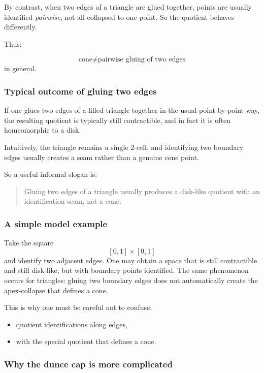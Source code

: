 \documentclass[12pt,a4paper]{article}
\theoremstyle{notespace}
\begin{document}
By contrast, when two edges of a triangle are glued together, points are usually identified \emph{pairwise}, not all collapsed to one point. So the quotient behaves differently.

Thus:

\[
\text{cone} \neq \text{pairwise gluing of two edges}
\]
in general.

\subsubsection{Typical outcome of gluing two edges}

If one glues two edges of a filled triangle together in the usual point-by-point way, the resulting quotient is typically still contractible, and in fact it is often homeomorphic to a disk.

Intuitively, the triangle remains a single 2-cell, and identifying two boundary edges usually creates a seam rather than a genuine cone point.

So a useful informal slogan is:

\begin{quote}
	Gluing two edges of a triangle usually produces a disk-like quotient with an identification seam, not a cone.
\end{quote}

\subsubsection{A simple model example}

Take the square
\[
[0,1]\times[0,1]
\]
and identify two adjacent edges. One may obtain a space that is still contractible and still disk-like, but with boundary points identified. The same phenomenon occurs for triangles: gluing two boundary edges does not automatically create the apex-collapse that defines a cone.

This is why one must be careful not to confuse:

\begin{itemize}
	\item quotient identifications along edges,
	\item with the special quotient that defines a cone.
\end{itemize}

\subsubsection{Why the dunce cap is more complicated}
\end{document}
